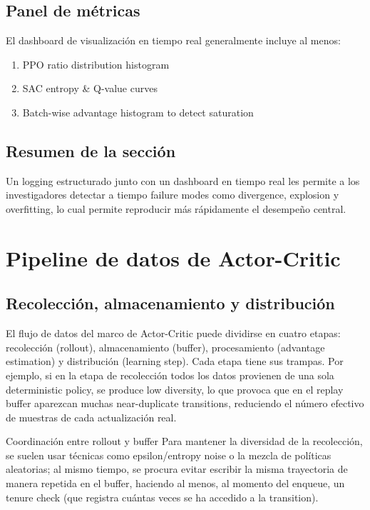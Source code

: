\documentclass[a4paper]{article}
\begin{document}
\subsection{Panel de métricas}

El dashboard de visualización en tiempo real generalmente incluye al menos:

\begin{enumerate}
    \item PPO ratio distribution histogram
    \item SAC entropy \& Q-value curves
    \item Batch-wise advantage histogram to detect saturation
\end{enumerate}

\subsection{Resumen de la sección}

Un logging estructurado junto con un dashboard en tiempo real les permite a los investigadores detectar a tiempo failure modes como divergence, explosion y overfitting, lo cual permite reproducir más rápidamente el desempeño central.

\section{Pipeline de datos de Actor-Critic}

\subsection{Recolección, almacenamiento y distribución}

El flujo de datos del marco de Actor-Critic puede dividirse en cuatro etapas: recolección (rollout), almacenamiento (buffer), procesamiento (advantage estimation) y distribución (learning step). Cada etapa tiene sus trampas. Por ejemplo, si en la etapa de recolección todos los datos provienen de una sola deterministic policy, se produce low diversity, lo que provoca que en el replay buffer aparezcan muchas near-duplicate transitions, reduciendo el número efectivo de muestras de cada actualización real.

\begin{knowledgebox}{Coordinación entre rollout y buffer}
Para mantener la diversidad de la recolección, se suelen usar técnicas como epsilon/entropy noise o la mezcla de políticas aleatorias; al mismo tiempo, se procura evitar escribir la misma trayectoria de manera repetida en el buffer, haciendo al menos, al momento del enqueue, un tenure check (que registra cuántas veces se ha accedido a la transition).
\end{knowledgebox}
\end{document}
